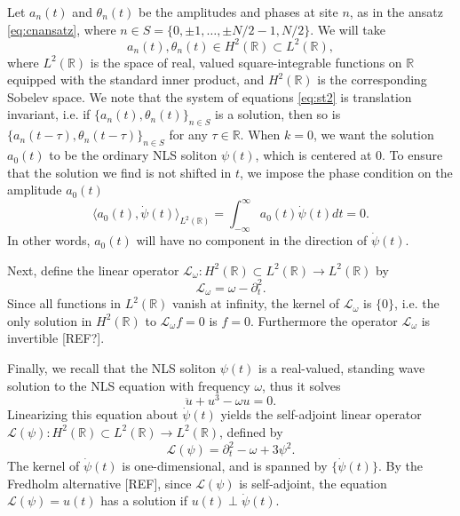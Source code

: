 \documentclass[11pt,reqno]{amsart}
\def\R{{\mathbb R}}
\def\calL{{\mathcal L}}
\def\Lw{{\mathcal{L}_\omega}}
\begin{document}
Let $a_n(t)$ and $\theta_n(t)$ be the amplitudes and phases at site $n$, as in the ansatz \cref{eq:cnansatz}, where $n \in S = \{ 0, \pm 1, \dots, \pm N/2-1, N/2 \}$. We will take 
\[
a_n(t), \theta_n(t) \in H^2(\R) \subset L^2(\R),
\]
where $L^2(\R)$ is the space of real, valued square-integrable functions on $\R$ equipped with the standard inner product, and $H^2(\R)$ is the corresponding Sobelev space. We note that the system of equations \cref{eq:st2} is translation invariant, i.e. if $\{ a_n(t), \theta_n(t)\}_{n\in S}$ is a solution, then so is $\{ a_n(t-\tau), \theta_n(t-\tau)\}_{n\in S}$ for any $\tau \in \R$. When $k = 0$, we want the solution $a_0(t)$ to be the ordinary NLS soliton $\psi(t)$, which is centered at 0. To ensure that the solution we find is not shifted in $t$, we impose the phase condition on the amplitude $a_0(t)$
\begin{equation}\label{eq:phasecond}
\langle a_0(t), \dot{\psi}(t) \rangle_{L^2(\R)} = \int_{-\infty}^\infty a_0(t) \dot{\psi}(t) dt = 0.
\end{equation}
In other words, $a_0(t)$ will have no component in the direction of $\dot{\psi}(t)$.

Next, define the linear operator $\Lw: H^2(\R) \subset L^2(\R) \rightarrow L^2(\R)$ by
\begin{equation}\label{eq:Lw}
\Lw = \omega - \partial_t^2.
\end{equation}
Since all functions in $L^2(\R)$ vanish at infinity, the kernel of $\Lw$ is $\{0\}$, i.e. the only solution in $H^2(\R)$ to $\Lw f = 0$ is $f = 0$. Furthermore the operator $\Lw$ is invertible [REF?].

Finally, we recall that the NLS soliton $\psi(t)$ is a real-valued, standing wave solution to the NLS equation with frequency $\omega$, thus it solves 
\begin{equation}\label{eq:NLSreal}
\ddot{u} + u^3 - \omega u = 0. 
\end{equation}
Linearizing this equation about $\dot{\psi}(t)$ yields the self-adjoint linear operator $\calL(\psi): H^2(\R) \subset L^2(\R) \rightarrow L^2(\R)$, defined by
\begin{equation}\label{eq:Lpsi}
\calL(\psi) = \partial_t^2 - \omega + 3 \psi^2.
\end{equation}
The kernel of $\dot{\psi}(t)$ is one-dimensional, and is spanned by $\{ \dot{\psi}(t) \}$. By the Fredholm alternative [REF], since $\calL(\psi)$ is self-adjoint, the equation $\calL(\psi) = u(t)$ has a solution if $u(t) \perp \dot{\psi}(t)$.
\end{document}
